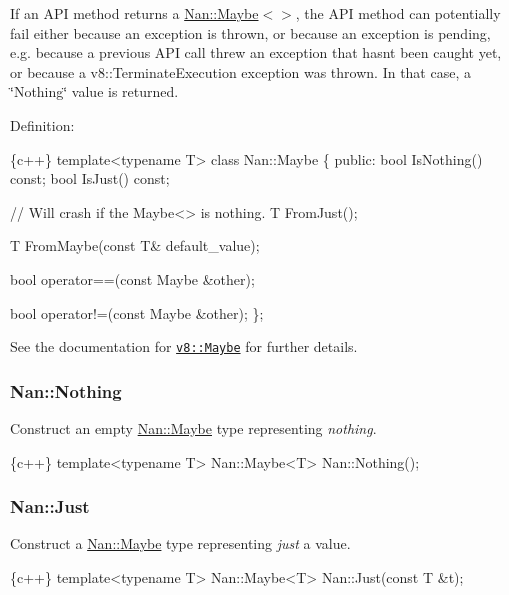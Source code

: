 If an A\+PI method returns a {\ttfamily \hyperlink{class_nan_1_1_maybe}{Nan\+::\+Maybe}$<$$>$}, the A\+PI method can potentially fail either because an exception is thrown, or because an exception is pending, e.\+g. because a previous A\+PI call threw an exception that hasn\textquotesingle{}t been caught yet, or because a {\ttfamily v8\+::\+Terminate\+Execution} exception was thrown. In that case, a \char`\"{}\+Nothing\char`\"{} value is returned.

Definition\+:


\begin{DoxyCode}
\{c++\}
template<typename T> class Nan::Maybe \{
 public:
  bool IsNothing() const;
  bool IsJust() const;

  // Will crash if the Maybe<> is nothing.
  T FromJust();

  T FromMaybe(const T& default\_value);

  bool operator==(const Maybe &other);

  bool operator!=(const Maybe &other);
\};
\end{DoxyCode}


See the documentation for \href{https://v8docs.nodesource.com/io.js-3.0/d9/d4b/classv8_1_1_maybe.html}{\tt {\ttfamily v8\+::\+Maybe}} for further details.

\label{_api_nan_nothing}%
 \subsubsection*{Nan\+::\+Nothing}

Construct an empty {\ttfamily \hyperlink{class_nan_1_1_maybe}{Nan\+::\+Maybe}} type representing {\itshape nothing}.


\begin{DoxyCode}
\{c++\}
template<typename T> Nan::Maybe<T> Nan::Nothing();
\end{DoxyCode}


\label{_api_nan_just}%
 \subsubsection*{Nan\+::\+Just}

Construct a {\ttfamily \hyperlink{class_nan_1_1_maybe}{Nan\+::\+Maybe}} type representing {\itshape just} a value.


\begin{DoxyCode}
\{c++\}
template<typename T> Nan::Maybe<T> Nan::Just(const T &t);
\end{DoxyCode}



